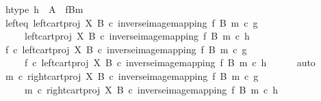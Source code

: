 \begin{isabellebody}
\ h{\isacharunderscore}{\kern0pt}type{\isacharcolon}{\kern0pt}\ {\isachardoublequoteopen}h\ {\isacharcolon}{\kern0pt}\ A\ {\isasymrightarrow}\ {\isacharparenleft}{\kern0pt}f\isactrlsup {\isacharminus}{\kern0pt}B{\isasymrparr}\isactrlbsub m\isactrlesub {\isacharparenright}{\kern0pt}{\isachardoublequoteclose}\isanewline
\ \ \isamarkupfalse%
\ left{\isacharunderscore}{\kern0pt}eq{\isacharcolon}{\kern0pt}\ {\isachardoublequoteopen}{\isacharparenleft}{\kern0pt}left{\isacharunderscore}{\kern0pt}cart{\isacharunderscore}{\kern0pt}proj\ X\ B\ {\isasymcirc}\isactrlsub c\ inverse{\isacharunderscore}{\kern0pt}image{\isacharunderscore}{\kern0pt}mapping\ f\ B\ m{\isacharparenright}{\kern0pt}\ {\isasymcirc}\isactrlsub c\ g\isanewline
\ \ \ \ {\isacharequal}{\kern0pt}\ {\isacharparenleft}{\kern0pt}left{\isacharunderscore}{\kern0pt}cart{\isacharunderscore}{\kern0pt}proj\ X\ B\ {\isasymcirc}\isactrlsub c\ inverse{\isacharunderscore}{\kern0pt}image{\isacharunderscore}{\kern0pt}mapping\ f\ B\ m{\isacharparenright}{\kern0pt}\ {\isasymcirc}\isactrlsub c\ h{\isachardoublequoteclose}\isanewline
\ \ \isamarkupfalse%
\ \isamarkupfalse%
\ {\isachardoublequoteopen}f\ {\isasymcirc}\isactrlsub c\ {\isacharparenleft}{\kern0pt}left{\isacharunderscore}{\kern0pt}cart{\isacharunderscore}{\kern0pt}proj\ X\ B\ {\isasymcirc}\isactrlsub c\ inverse{\isacharunderscore}{\kern0pt}image{\isacharunderscore}{\kern0pt}mapping\ f\ B\ m{\isacharparenright}{\kern0pt}\ {\isasymcirc}\isactrlsub c\ g\isanewline
\ \ \ \ {\isacharequal}{\kern0pt}\ f\ {\isasymcirc}\isactrlsub c\ {\isacharparenleft}{\kern0pt}left{\isacharunderscore}{\kern0pt}cart{\isacharunderscore}{\kern0pt}proj\ X\ B\ {\isasymcirc}\isactrlsub c\ inverse{\isacharunderscore}{\kern0pt}image{\isacharunderscore}{\kern0pt}mapping\ f\ B\ m{\isacharparenright}{\kern0pt}\ {\isasymcirc}\isactrlsub c\ h{\isachardoublequoteclose}\isanewline
\ \ \ \ \isamarkupfalse%
\ auto\isanewline
\ \ \isamarkupfalse%
\ \isamarkupfalse%
\ {\isachardoublequoteopen}m\ {\isasymcirc}\isactrlsub c\ {\isacharparenleft}{\kern0pt}right{\isacharunderscore}{\kern0pt}cart{\isacharunderscore}{\kern0pt}proj\ X\ B\ {\isasymcirc}\isactrlsub c\ inverse{\isacharunderscore}{\kern0pt}image{\isacharunderscore}{\kern0pt}mapping\ f\ B\ m{\isacharparenright}{\kern0pt}\ {\isasymcirc}\isactrlsub c\ g\isanewline
\ \ \ \ {\isacharequal}{\kern0pt}\ m\ {\isasymcirc}\isactrlsub c\ {\isacharparenleft}{\kern0pt}right{\isacharunderscore}{\kern0pt}cart{\isacharunderscore}{\kern0pt}proj\ X\ B\ {\isasymcirc}\isactrlsub c\ inverse{\isacharunderscore}{\kern0pt}image{\isacharunderscore}{\kern0pt}mapping\ f\ B\ m{\isacharparenright}{\kern0pt}\ {\isasymcirc}\isactrlsub c\ h{\isachardoublequoteclose}\isanewline

\end{isabellebody}
